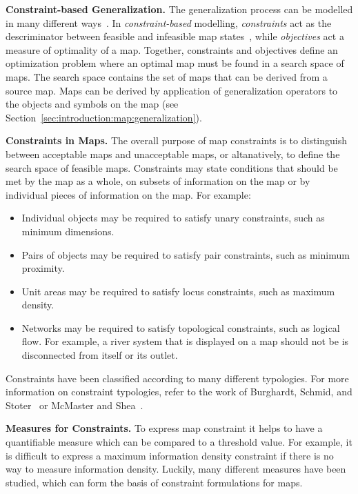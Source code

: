\documentclass[11pt, oneside]{report}
\newcommand{\minisec}[1]{\noindent\textbf{#1.}}
\begin{document}
{\minisec{Constraint-based Generalization}
The generalization process can be modelled in many different ways~\cite{harrie2007modelling}. In \emph{constraint-based} modelling, \emph{constraints} act as the descriminator between feasible and infeasible map states~\cite{harrie1999constraint,ware2003generalization_sa}, while \emph{objectives} act a measure of optimality of a map. Together, constraints and objectives define an optimization problem where an optimal map must be found in a search space of maps. The search space contains the set of maps that can be derived from a source map. Maps can be derived by application of generalization operators to the objects and symbols on the map (see Section~\ref{sec:introduction:map:generalization}).

\minisec{Constraints in Maps}
The overall purpose of map constraints is to distinguish between acceptable maps and unacceptable maps, or altanatively, to define the search space of feasible maps. Constraints may state conditions that should be met by the map as a whole, on subsets of information on the map or by individual pieces of information on the map. For example:

\begin{itemize}
\item Individual objects may be required to satisfy unary constraints, such as minimum dimensions.
\item Pairs of objects may be required to satisfy pair constraints, such as minimum proximity.
\item Unit areas may be required to satisfy locus constraints, such as maximum density.
\item Networks may be required to satisfy topological constraints, such as logical flow. For example, a river system that is displayed on a map should not be is disconnected from itself or its outlet.
\end{itemize}

Constraints have been classified according to many different typologies. For more information on constraint typologies, refer to the work of Burghardt, Schmid, and Stoter~\cite{burghardt2007investigations} or  McMaster and Shea~\cite{mcmaster1992generalization}.

\minisec{Measures for Constraints}
To express map constraint it helps to have a quantifiable measure which can be compared to a threshold value. For example, it is difficult to express a maximum information density constraint if there is no way to measure information density. Luckily, many different measures have been studied, which can form the basis of constraint formulations for maps.

}
\end{document}
